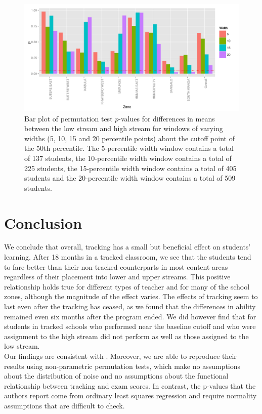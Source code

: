 \documentclass[11pt]{article}
\begin{document}
  \begin{figure}[H]
 \centering
 \includegraphics[scale=0.6]{RD_pval.pdf}
 \caption{Bar plot of permutation test $p$-values for differences in means between the low stream and high stream for windows of varying widths (5, 10, 15 and 20 percentile points) about the cutoff point of the 50th percentile. The 5-percentile width window contains a total of 137 students, the 10-percentile width window contains a total of 225 students, the 15-percentile width window contains a total of 405 students and the 20-percentile width window contains a total of 509 students.}
 \label{fig:pval_window}
 \end{figure}
 
 
 
 
 
 
\section{Conclusion}
We conclude that overall, tracking has a small but beneficial effect on students' learning.  After 18 months in a tracked classroom, we see that the students tend to fare better than their non-tracked counterparts in most content-areas regardless of their placement into lower and upper streams.  This positive relationship holds true for different types of teacher and for many of the school zones, although the magnitude of the effect varies. The effects of tracking seem to last even after the tracking has ceased, as we found that the differences in ability remained even six months after the program ended. We did however find that for students in tracked schools who performed near the baseline cutoff and who were assignment to the high stream did not perform as well as those assigned to the low stream. \\

Our findings are consistent with \cite{duflo2011}. Moreover, we are able to reproduce their results using non-parametric permutation tests, which make no assumptions about the distribution of noise and no assumptions about the functional relationship between tracking and exam scores. In contrast, the p-values that the authors report come from ordinary least squares regression and require normality assumptions that are difficult to check.



 
\end{document}
